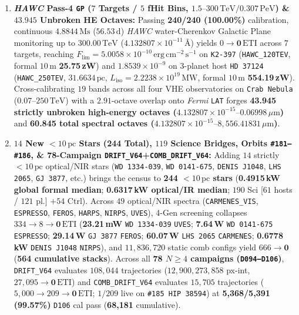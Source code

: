 \documentclass[twocolumn,10pt]{article}
\begin{document}
\begin{enumerate}
  \item \textbf{\textit{HAWC} Pass-4 \texttt{GP} ($7$ Targets / $5$ fHit Bins, $1.5\text{--}300\,\mathrm{TeV} / 0.307\,\mathrm{PeV}$) \& $43.945$ Unbroken HE Octaves:} Passing \textbf{240/240 (100.00\%)} calibration, continuous $4.8844\,\text{Ms}$ ($56.53\,\text{d}$) \textit{HAWC} water-Cherenkov Galactic Plane monitoring \cite{Abeysekara2017} up to $300.00\,\mathrm{TeV}$ ($4.132807\times 10^{-11}\,\text{\AA}$) yields $0\rightarrow \mathbf{0\,\mathrm{ETI}}$ across $7$ targets, reaching $F_{\mathrm{lim}} = 5.0058\times 10^{-10}\,\mathrm{erg\,cm^{-2}\,s^{-1}}$ on \texttt{K2-397} (\texttt{HAWC\_120TEV}, formal $10\,\text{m}$ \textbf{25.75\,zW}) and $1.8539\times 10^{-9}$ on 3-planet host \texttt{HD\,37124} (\texttt{HAWC\_250TEV}, $31.6634\,\text{pc}$, $L_{\mathrm{iso}} = 2.2238\times 10^{19}\,\mathrm{MW}$, formal $10\,\text{m}$ \textbf{554.19\,zW}). Cross-calibrating $19$ bands across all four VHE observatories on \texttt{Crab Nebula} ($0.07\text{--}250\,\mathrm{TeV}$) with a $2.91$-octave overlap onto \textit{Fermi} \texttt{LAT} forges \textbf{43.945 strictly unbroken high-energy octaves ($4.132807\times 10^{-15}\text{--}0.06998\,\mu\text{m}$)} and \textbf{60.845 total spectral octaves ($4.132807\times 10^{-15}\text{--}8{,}556.41831\,\mu\text{m}$)}.
  \item \textbf{$14$ New $<10\,\text{pc}$ Stars (\textbf{244 Total}), $119$ Science Bridges, Orbits \texttt{\#181--\#186}, \& 78-Campaign \texttt{DRIFT\_V64}+\texttt{COMB\_DRIFT\_V64}:} Adding $14$ strictly $<10\,\text{pc}$ optical/NIR stars (\texttt{WD\,1334-039}, \texttt{WD\,0141-675}, \texttt{DENIS\,J1048}, \texttt{LHS\,2065}, \texttt{GJ\,3877}, etc.) brings the census to \textbf{244 $<10\,\text{pc}$ stars} (\textbf{0.4915\,kW global formal median}; \textbf{0.6317\,kW optical/IR median}; $190$ Sci [$61$ hosts / $121$ pl.] $+ 54$ Ctrl). Across $49$ optical/NIR spectra (\texttt{CARMENES\_VIS}, \texttt{ESPRESSO}, \texttt{FEROS}, \texttt{HARPS}, \texttt{NIRPS}, \texttt{UVES}), 4-Gen screening collapses $334\rightarrow 8\rightarrow \mathbf{0\,\mathrm{ETI}}$ (\textbf{23.21\,mW} \texttt{WD\,1334-039} \texttt{UVES}; \textbf{7.64\,W} \texttt{WD\,0141-675} \texttt{ESPRESSO}; \textbf{29.14\,W} \texttt{GJ\,3877} \texttt{FEROS}; \textbf{60.07\,W} \texttt{LHS\,2065} \texttt{CARMENES}; \textbf{0.6778\,kW} \texttt{DENIS\,J1048} \texttt{NIRPS}), and $11{,}836{,}720$ static comb configs yield $666\rightarrow \mathbf{0}$ (\textbf{564 cumulative stacks}). Across all \textbf{78 $N\ge 4$ campaigns (\texttt{D094--D106})}, \texttt{DRIFT\_V64} evaluates $108{,}044$ trajectories ($12{,}900{,}273{,}858$ px-int, $27{,}095\rightarrow \mathbf{0\,\mathrm{ETI}}$) and \texttt{COMB\_DRIFT\_V64} evaluates $15{,}705$ trajectories ($5{,}000\rightarrow 209\rightarrow \mathbf{0\,\mathrm{ETI}}$; $1/209$ live on \texttt{\#185 HIP\,38594}) at \textbf{5,368/5,391 (99.57\%)} \texttt{D106} cal pass (\textbf{68,181} cumulative).
\end{enumerate}
\end{document}
